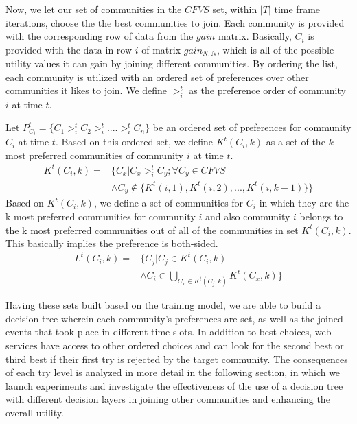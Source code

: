\documentclass[10pt,journal,cspaper,compsoc]{IEEEtran}
\begin{document}
Now, we let our set of communities in the $CFVS$ set, within $|T|$ time frame iterations, choose the the best communities to join. Each community is provided with the corresponding row of data from the $gain$ matrix. Basically, $C_i$ is provided with the data in row $i$ of matrix $gain_{N,N}$, which is all of the possible utility values it can gain by joining different communities. By ordering the list, each community is utilized with an ordered set of preferences over other communities it likes to join. We define $>_{i}^t$ as the preference order of community $i$ at time $t$.

Let $P_{C_i}^t = \{C_1 >_{i}^t C_2 >_{i}^t .... >_{i}^t C_n\}$ be an ordered set of preferences for community $C_i$ at time $t$. Based on this ordered set, we define $K^t(C_i, k)$ as a set of the $k$ most preferred communities of community $i$ at time $t$.
\begin{equation}\label{h_t_pref_top}
\begin{split}				
K^t(C_i, k) = &\Big\{C_x | C_x >_{i}^t C_y; \forall C_y \in CFVS\ \\
				      &\wedge C_y \notin \{K^t(i, 1),K^t(i, 2),...,K^t(i, k-1)\} \Big\}				
\end{split}
\end{equation}
Based on $K^t(C_i, k)$, we define a set of communities for $C_i$ in which they are the k most preferred communities for community $i$ and also community $i$ belongs to the k most preferred communities out of all of the communities in set $K^t(C_i, k)$. This basically implies the preference is both-sided.
\begin{equation}\label{l_t_top_both}
\begin{split}	
L^t(C_i,k) = &\Big\{C_j | C_j \in K^t(C_i, k) \\
             &\wedge C_i \in \bigcup_{C_x \in K^t(C_j, k)}K^t(C_x, k)\Big\}
\end{split}
\end{equation}

Having these sets built based on the training model, we are able to build a decision tree wherein each community's preferences are set, as well as the joined events that took place in different time slots. In addition to best choices, web services have access to other ordered choices and can look for the second best or third best if their first try is rejected by the target community. The consequences of each try level is analyzed in more detail in the following section, in which we launch experiments and investigate the effectiveness of the use of a decision tree with different decision layers in joining other communities and enhancing the overall utility. 
\end{document}
